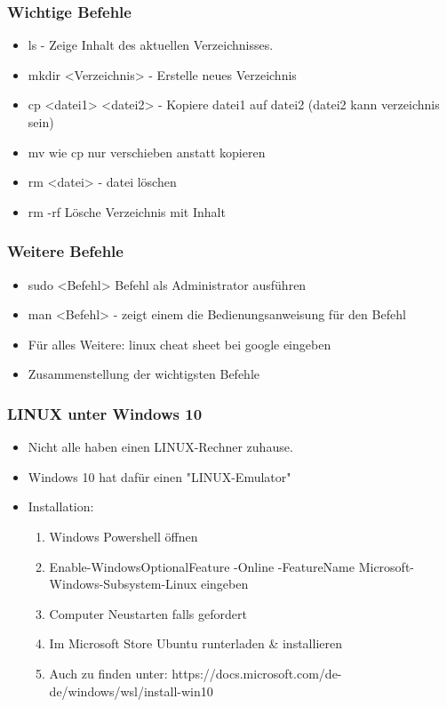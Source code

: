 \documentclass[ignorenonframetext,12pt]{beamer}
\theoremstyle{definition}
\theoremstyle{definition}
\begin{document}
\begin{frame}[fragile]
\frametitle{Wichtige Befehle}
\begin{itemize}
\item ls - Zeige Inhalt des aktuellen Verzeichnisses.
\item mkdir <Verzeichnis> - Erstelle neues Verzeichnis
\item cp <datei1> <datei2> - Kopiere datei1 auf datei2 (datei2 kann verzeichnis sein)
\item mv wie cp nur verschieben anstatt kopieren
\item rm <datei> - datei löschen
\item rm -rf Lösche Verzeichnis mit Inhalt
\end{itemize}
\end{frame}


\begin{frame}
\frametitle{Weitere Befehle}
\begin{itemize}
\item sudo <Befehl> Befehl als Administrator ausführen
\item man <Befehl> - zeigt einem die Bedienungsanweisung für den Befehl
\item Für alles Weitere: linux cheat sheet bei google eingeben
\item Zusammenstellung der wichtigsten Befehle
\end{itemize}
\end{frame}


\begin{frame}[fragile]
\frametitle{LINUX unter Windows 10}
\begin{itemize}
\item Nicht alle haben einen LINUX-Rechner zuhause.
\item Windows 10 hat dafür einen "LINUX-Emulator"
\item Installation:
\begin{enumerate} 
\item Windows Powershell öffnen
\item Enable-WindowsOptionalFeature -Online -FeatureName Microsoft-Windows-Subsystem-Linux eingeben
\item Computer Neustarten falls gefordert
\item Im Microsoft Store Ubuntu runterladen \& installieren
\item Auch zu finden unter: https://docs.microsoft.com/de-de/windows/wsl/install-win10
\end{enumerate}
\end{itemize}
\end{frame}
\end{document}
